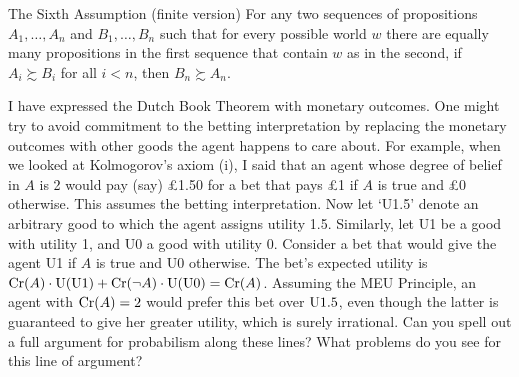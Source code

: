 \begin{genericthm}{The Sixth Assumption (finite version)}
  For any two sequences of propositions $A_1,\ldots,A_n$ and $B_1,\ldots,B_n$
  such that for every possible world $w$ there are equally many propositions in
  the first sequence that contain $w$ as in the second, if $A_i \succsim B_i$
  for all $i < n$, then $B_n \succsim A_n$.
\end{genericthm}

\begin{essay}
  I have expressed the Dutch Book Theorem with monetary outcomes. One might try
  to avoid commitment to the betting interpretation by replacing the monetary
  outcomes with other goods the agent happens to care about. For example, when
  we looked at Kolmogorov's axiom (i), I said that an agent whose degree of
  belief in $A$ is 2 would pay (say) £1.50 for a bet that pays £1 if $A$ is true
  and £0 otherwise. This assumes the betting interpretation. Now let `U1.5'
  denote an arbitrary good to which the agent assigns utility 1.5. Similarly,
  let U1 be a good with utility 1, and U0 a good with utility 0. Consider a bet
  that would give the agent U1 if $A$ is true and U0 otherwise. The bet's
  expected utility is $\text{Cr}(A) \cdot \text{U}(\text{U}1) + \text{Cr}(\neg A) \cdot \text{U}(\text{U}0) = \text{Cr}(A)$.
  Assuming the MEU Principle, an agent with $\text{Cr}(A) = 2$ would prefer this bet
  over $\text{U}1.5$, even though the latter is guaranteed to give her greater utility,
  which is surely irrational. Can you spell out a full argument for probabilism
  along these lines? What problems do you see for this line of argument?
\end{essay}

